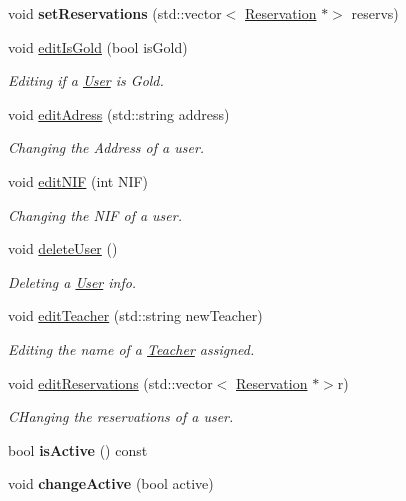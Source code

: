 \begin{DoxyCompactItemize}
\mbox{\label{class_user_a69d12edf2fb136601b7b9558f1c7b1e2}} 
void {\bfseries set\+Reservations} (std\+::vector$<$ \mbox{\hyperlink{class_reservation}{Reservation}} $\ast$$>$ reservs)
\item 
void \mbox{\hyperlink{class_user_a092c80f086767a8c204320b6517bfc58}{edit\+Is\+Gold}} (bool is\+Gold)
\begin{DoxyCompactList}\small\item\em Editing if a \mbox{\hyperlink{class_user}{User}} is Gold. \end{DoxyCompactList}\item 
void \mbox{\hyperlink{class_user_a9d826d552e81ecc17828be848e02519b}{edit\+Adress}} (std\+::string address)
\begin{DoxyCompactList}\small\item\em Changing the Address of a user. \end{DoxyCompactList}\item 
void \mbox{\hyperlink{class_user_a470738d77c8d53ab5c41cdcd74497a82}{edit\+N\+IF}} (int N\+IF)
\begin{DoxyCompactList}\small\item\em Changing the N\+IF of a user. \end{DoxyCompactList}\item 
\mbox{\label{class_user_ab29f666469897568a6c592869cc0a4f9}} 
void \mbox{\hyperlink{class_user_ab29f666469897568a6c592869cc0a4f9}{delete\+User}} ()
\begin{DoxyCompactList}\small\item\em Deleting a \mbox{\hyperlink{class_user}{User}} info. \end{DoxyCompactList}\item 
void \mbox{\hyperlink{class_user_a3161559f3e7b4c29b8a60a51f3d002ad}{edit\+Teacher}} (std\+::string new\+Teacher)
\begin{DoxyCompactList}\small\item\em Editing the name of a \mbox{\hyperlink{class_teacher}{Teacher}} assigned. \end{DoxyCompactList}\item 
void \mbox{\hyperlink{class_user_a0f8f72211ae7a56e413ad70358f96a19}{edit\+Reservations}} (std\+::vector$<$ \mbox{\hyperlink{class_reservation}{Reservation}} $\ast$$>$r)
\begin{DoxyCompactList}\small\item\em C\+Hanging the reservations of a user. \end{DoxyCompactList}\item 
\mbox{\label{class_user_a9c6060d37c200406c1561fd211181127}} 
bool {\bfseries is\+Active} () const
\item 
\mbox{\label{class_user_a285d0407afd20799a269b45fc9e7cfe3}} 
void {\bfseries change\+Active} (bool active)
\end{DoxyCompactItemize}
